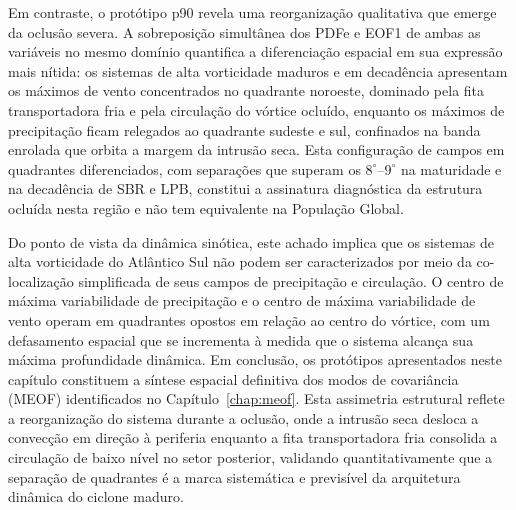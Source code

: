 Em contraste, o protótipo p90 revela uma reorganização qualitativa que emerge da oclusão severa. A sobreposição simultânea dos PDFe e EOF1 de ambas as variáveis no mesmo domínio quantifica a diferenciação espacial em sua expressão mais nítida: os sistemas de alta vorticidade maduros e em decadência apresentam os máximos de vento concentrados no quadrante noroeste, dominado pela fita transportadora fria e pela circulação do vórtice ocluído, enquanto os máximos de precipitação ficam relegados ao quadrante sudeste e sul, confinados na banda enrolada que orbita a margem da intrusão seca. Esta configuração de campos em quadrantes diferenciados, com separações que superam os $8^{\circ}$--$9^{\circ}$ na maturidade e na decadência de SBR e LPB, constitui a assinatura diagnóstica da estrutura ocluída nesta região e não tem equivalente na População Global.

Do ponto de vista da dinâmica sinótica, este achado implica que os sistemas de alta vorticidade do Atlântico Sul não podem ser caracterizados por meio da co-localização simplificada de seus campos de precipitação e circulação.
O centro de máxima variabilidade de precipitação e o centro de máxima variabilidade de vento operam em quadrantes opostos em relação ao centro do vórtice, com um defasamento espacial que se incrementa à medida que o sistema alcança sua máxima profundidade dinâmica.
Em conclusão, os protótipos apresentados neste capítulo constituem a síntese espacial definitiva dos modos de covariância (MEOF) identificados no Capítulo~\ref{chap:meof}. Esta assimetria estrutural reflete a reorganização do sistema durante a oclusão, onde a intrusão seca desloca a convecção em direção à periferia enquanto a fita transportadora fria consolida a circulação de baixo nível no setor posterior, validando quantitativamente que a separação de quadrantes é a marca sistemática e previsível da arquitetura dinâmica do ciclone maduro.